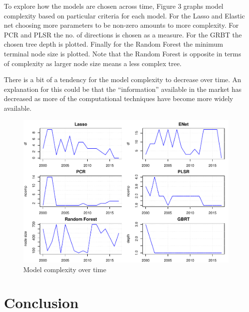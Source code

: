 \documentclass[11pt]{article}
\begin{document}
To explore how the models are chosen across time, Figure 3 graphs model complexity based on particular criteria for each model. For the Lasso and Elastic net choosing more
parameters to be non-zero amounts to more complexity. For PCR and PLSR
the no. of directions is chosen as a measure. For the GRBT the chosen
tree depth is plotted. Finally for the Random Forest the minimum
terminal node size is plotted. Note that the Random Forest is opposite
in terms of complexity as larger node size means a less complex tree.

There is a bit of a tendency for the model complexity to decrease over
time. An explanation for this could be that the ``information''
available in the market has decreased as more of the computational
techniques have become more widely available.

\begin{figure}[H]
\includegraphics[width=0.75\linewidth]{mark_files/figure-latex/complexity_plots-1} \caption{Model complexity over time}\label{fig:complexity_plots}
\end{figure}

\hypertarget{conclusion}{%
\section{Conclusion}\label{conclusion}}
\end{document}
